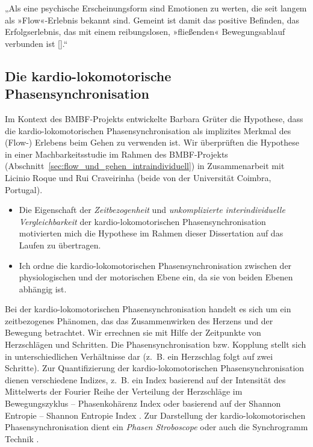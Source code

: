 „Als eine psychische Erscheinungsform sind Emotionen zu werten, die seit langem als »Flow«-Erlebnis bekannt sind. Gemeint ist damit das positive Befinden, das Erfolgserlebnis, das mit einem reibungslosen, »fließenden« Bewegungsablauf verbunden ist [\textellipsis].“

\subsection{Die kardio-lokomotorische Phasensynchronisation} 

\label{ssub:die_kardio_lokomotorische_phasensynchronisation}

Im Kontext des \acs{BMBF}-Projekts entwickelte Barbara Grüter die Hypothese, dass die kardio-lokomotorischen Phasensynchronisation als implizites Merkmal des (Flow-) Erlebens beim Gehen zu verwenden ist. Wir überprüften die Hypothese in einer Machbarkeitsstudie im Rahmen des \acs{BMBF}-Projekts (Abschnitt~\ref{sec:flow_und_gehen_intraindividuell}) in Zusammenarbeit mit Licinio Roque und Rui Craveirinha (beide von der Universität Coimbra, Portugal). 
\begin{itemize}
	
	\item Die Eigenschaft der \emph{Zeitbezogenheit} und \emph{unkomplizierte interindividuelle Vergleichbarkeit} der kardio-lokomotorischen Phasensynchronisation motivierten mich die Hypothese im Rahmen dieser Dissertation auf das Laufen zu übertragen.
	
	\item Ich ordne die kardio-lokomotorischen Phasensynchronisation zwischen der physiologischen und der motorischen Ebene ein, da sie von beiden Ebenen abhängig ist.
	
\end{itemize}

Bei der kardio-lokomotorischen Phasensynchronisation handelt es sich um ein zeitbezogenes Phänomen, das das Zusammenwirken des Herzens und der Bewegung betrachtet. Wir errechnen sie mit Hilfe der Zeitpunkte von Herzschlägen und Schritten. Die Phasensynchronisation bzw. Kopplung stellt sich in unterschiedlichen Verhältnisse dar (z.~B. ein Herzschlag folgt auf zwei Schritte). Zur Quantifizierung der kardio-lokomotorischen Phasensynchronisation dienen verschiedene Indizes, z.~B. ein Index basierend auf der Intensität des Mittelwerts der Fourier Reihe der Verteilung der Herzschläge im Bewegungszyklus -- Phasenkohärenz Index \citep{Rosenblum2003} oder basierend auf der Shannon Entropie -- Shannon Entropie Index \citep{Tass1998, Niizeki2005}. Zur Darstellung der kardio-lokomotorischen Phasensynchronisation dient ein \emph{Phasen Stroboscope} \citep{Mrowka2000} oder auch die Synchrogramm Technik \citep{Schafer1999}.

